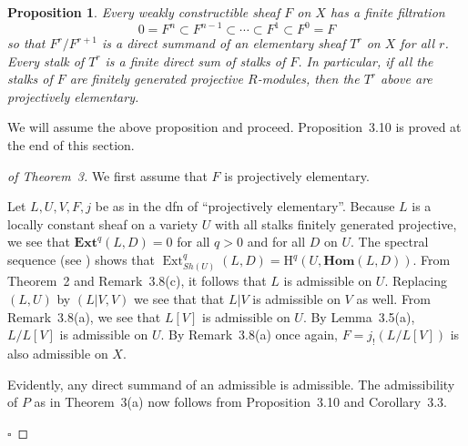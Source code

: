 \documentclass[10pt,twoside]{article}
\newtheorem{prop}[thm]{Proposition}
\newcommand{\homology}{{\mathrm {H}}}
\newcommand{\Ext}{{\operatorname{Ext}}}
\newcommand{\HHom}{{\mathbf{Hom}}}
\newcommand{\EExt}{{\mathbf{Ext}}}
\newcommand{\qed}{\nopagebreak\par\hspace*{\fill}$\square$\par\vskip2mm}
\newtheorem{proof}{Proof}
\begin{document}
\renewcommand{\thethm}{3.10}
\begin{prop} Every weakly constructible
sheaf $F$ on $X$ has a finite filtration 
$$
0=F^n\subset F^{n-1} \subset\cdots \subset F^1 \subset F^0=F
$$
so that $F^r/F^{r+1}$ is a \emph{direct summand} of
 an elementary sheaf $T^r$ on $X$ for all $r$. Every stalk of
 $T^r$ is a finite direct sum of stalks of $F$. In particular,
 if all the stalks of $F$ are finitely generated projective 
$R$-modules, then the $T^r$ above are projectively elementary.
\end{prop} 

We will assume the above proposition and proceed. 
Proposition~3.10 is proved at the end of this section.


\begin{proof}[of Theorem~3]
We first assume that $F$ is projectively elementary.

Let $L,U,V,F,j$ be as in the dfn of ``projectively elementary''.
Because $L$ is a locally constant sheaf
on a variety $U$ with all stalks finitely generated projective,
we see that $\EExt^q(L,D)=0$ for all $q>0$ and for all $D$ on $U$.
The spectral sequence (see \cite[Thm.~4.2.1,~page~188]{nori:Toh}) shows that  
$\Ext^q_{Sh(U)}(L,D)=\homology^q(U,\HHom(L,D))$. 
From Theorem~2 and Remark~3.8(c), it follows that $L$ is admissible on $U$. 
Replacing $(L,U)$ by $(L|V,V)$ we see that that $L|V$ is admissible on $V$ as 
well. From Remark~3.8(a), we see that $L[V]$ is admissible on $U$. 
By Lemma~3.5(a),  $L/L[V]$ is admissible on $U$. By Remark~3.8(a) once again, 
 $F=j_!(L/L[V])$ is also admissible on $X$. 

Evidently, any direct summand of an admissible is admissible. The
admissibility of $P$ as in Theorem~3(a) now follows from Proposition~3.10 and 
Corollary~3.3. 
\qed\end{proof}

\renewcommand{\thethm}{3.11}
\end{document}
